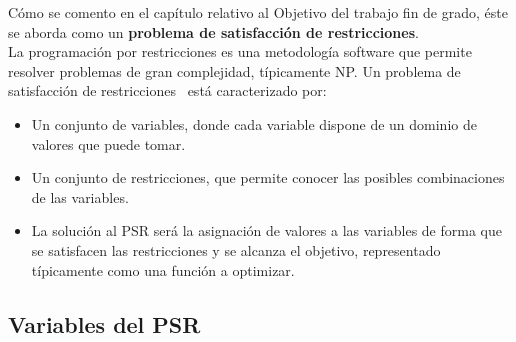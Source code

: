 Cómo se comento en el capítulo relativo al Objetivo del trabajo fin de grado, éste se aborda como un \textbf{problema de satisfacción de restricciones}.\\

La programación por restricciones es una metodología software que permite resolver problemas de gran complejidad, típicamente NP. Un problema de satisfacción de restricciones~\cite{Russ06} está caracterizado por:
\begin{itemize}
	\item Un conjunto de variables, donde cada variable dispone de un dominio de valores que puede tomar.
	\item Un conjunto de restricciones, que permite conocer las posibles combinaciones de las variables.
	\item La solución al PSR será la asignación de valores a las variables de forma que se satisfacen las restricciones y se alcanza el objetivo, representado típicamente como una función a optimizar.
\end{itemize}

\subsection{Variables del PSR}

